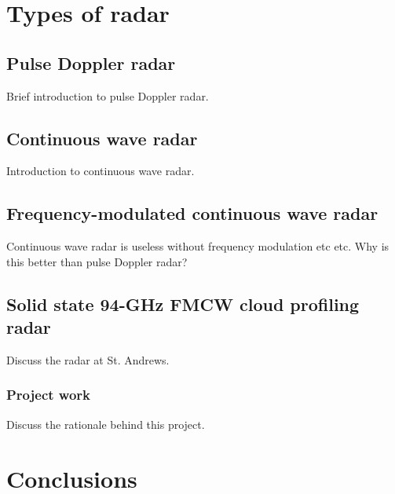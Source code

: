 \documentclass{article}
\begin{document}
\section{Types of radar}
\subsection{Pulse Doppler radar} \label{sec:PulseDopperRadar}
Brief introduction to pulse Doppler radar.

\subsection{Continuous wave radar} \label{sec:CWR}
Introduction to continuous wave radar.

\subsection{Frequency-modulated continuous wave radar} \label{sec:FMCWR}
Continuous wave radar is useless without frequency modulation etc etc.
Why is this better than pulse Doppler radar?

\subsection{Solid state 94-GHz FMCW cloud profiling radar}
Discuss the radar at St. Andrews.

\subsubsection{Project work}
Discuss the rationale behind this project.

\section{Conclusions} \label{sec:Conclusions}


\printbibliography
\end{document}
